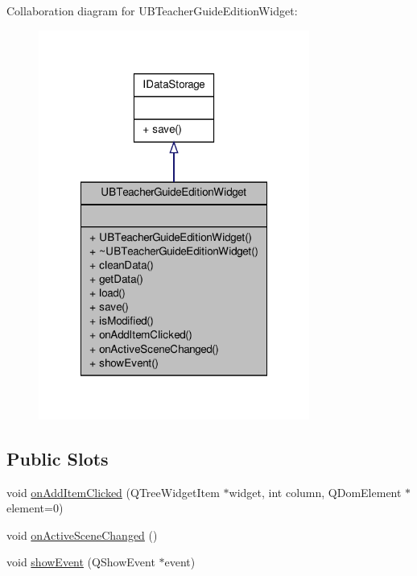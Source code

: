 Collaboration diagram for U\-B\-Teacher\-Guide\-Edition\-Widget\-:
\nopagebreak
\begin{figure}[H]
\begin{center}
\leavevmode
\includegraphics[width=252pt]{d5/d34/class_u_b_teacher_guide_edition_widget__coll__graph}
\end{center}
\end{figure}
\subsection*{Public Slots}
\begin{DoxyCompactItemize}
\item 
void \hyperlink{class_u_b_teacher_guide_edition_widget_ae43e991167e2f4afb5415339bd59cbd4}{on\-Add\-Item\-Clicked} (Q\-Tree\-Widget\-Item $\ast$widget, int column, Q\-Dom\-Element $\ast$element=0)
\item 
void \hyperlink{class_u_b_teacher_guide_edition_widget_a04c5f5c23abde12964e288ede60d9f16}{on\-Active\-Scene\-Changed} ()
\item 
void \hyperlink{class_u_b_teacher_guide_edition_widget_a589022818fe6717ddf09b642f2c2ed66}{show\-Event} (Q\-Show\-Event $\ast$event)
\end{DoxyCompactItemize}
